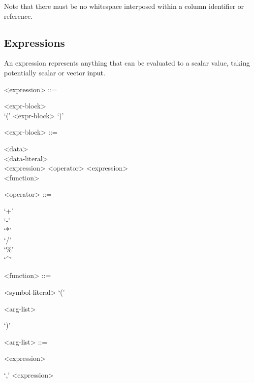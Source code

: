 Note that there must be no whitespace interposed within a column
identifier or reference.

\subsection{Expressions}

An expression represents anything that can be evaluated to a scalar
value, taking potentially scalar or vector input.

\begin{grammar}
  <expression> ::= \begin{syntdiag}
    \begin{stack}
      <expr-block> \\
      `(' <expr-block> `)'
    \end{stack}
  \end{syntdiag}

  <expr-block> ::= \begin{syntdiag}
    \begin{stack}
      <data> \\
      <data-literal> \\
      <expression> <operator> <expression> \\
      <function>
    \end{stack}
  \end{syntdiag}

  <operator> ::= \begin{syntdiag}
    \begin{stack}
      `+' \\
      `-' \\
      `*' \\
      `/' \\
      `\%' \\
      `^'
    \end{stack}
  \end{syntdiag}

  <function> ::= \begin{syntdiag}
    <symbol-literal>
    `('
    \begin{stack}
      <arg-list> \\
    \end{stack}
    `)'
  \end{syntdiag}

  <arg-list> ::= \begin{syntdiag}
    <expression>
    \begin{stack}
      \begin{rep}`,' <expression>\end{rep} \\
    \end{stack}
  \end{syntdiag}
\end{grammar}

